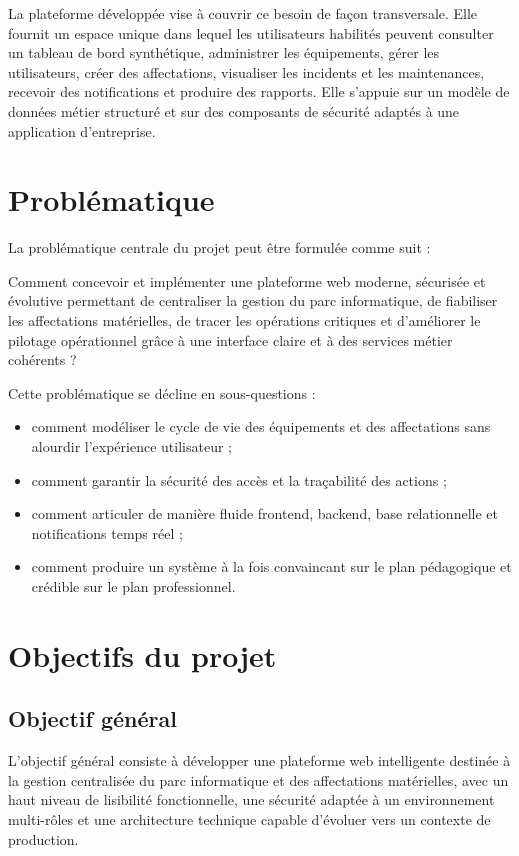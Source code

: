 La plateforme développée vise à couvrir ce besoin de façon transversale. Elle fournit un espace unique dans lequel les utilisateurs habilités peuvent consulter un tableau de bord synthétique, administrer les équipements, gérer les utilisateurs, créer des affectations, visualiser les incidents et les maintenances, recevoir des notifications et produire des rapports. Elle s'appuie sur un modèle de données métier structuré et sur des composants de sécurité adaptés à une application d'entreprise.

\section{Problématique}
La problématique centrale du projet peut être formulée comme suit :

\begin{keybox}[Problématique]
Comment concevoir et implémenter une plateforme web moderne, sécurisée et évolutive permettant de centraliser la gestion du parc informatique, de fiabiliser les affectations matérielles, de tracer les opérations critiques et d'améliorer le pilotage opérationnel grâce à une interface claire et à des services métier cohérents ?
\end{keybox}

Cette problématique se décline en sous-questions :
\begin{itemize}
  \item comment modéliser le cycle de vie des équipements et des affectations sans alourdir l'expérience utilisateur ;
  \item comment garantir la sécurité des accès et la traçabilité des actions ;
  \item comment articuler de manière fluide frontend, backend, base relationnelle et notifications temps réel ;
  \item comment produire un système à la fois convaincant sur le plan pédagogique et crédible sur le plan professionnel.
\end{itemize}

\section{Objectifs du projet}
\subsection{Objectif général}
L'objectif général consiste à développer une plateforme web intelligente destinée à la gestion centralisée du parc informatique et des affectations matérielles, avec un haut niveau de lisibilité fonctionnelle, une sécurité adaptée à un environnement multi-rôles et une architecture technique capable d'évoluer vers un contexte de production.


